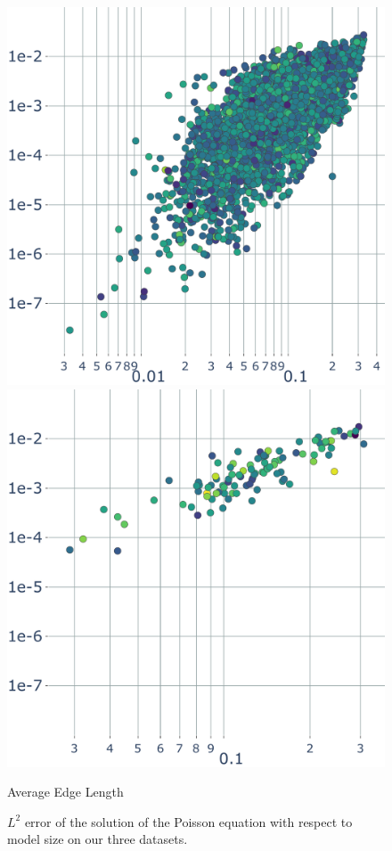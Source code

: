 \begin{figure}
    \parbox{.3\linewidth}{\includegraphics[width=\linewidth]{curve_meshing_in_shell_tex/figs/stats/error_ABC}}\hfill
    \parbox{.3\linewidth}{\includegraphics[width=\linewidth]{curve_meshing_in_shell_tex/figs/stats/error_PolyCube}}\par
    \scriptsize{Average Edge Length}
    \caption{$L^2$ error of the solution of the Poisson equation with respect to model size on our three datasets.}
    \label{bichon:fig:large-scale-poisson}
\end{figure}

